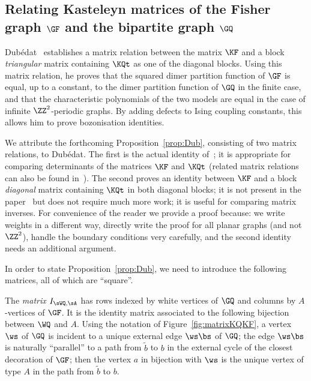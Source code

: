 \documentclass[a4paper,twoside,11pt]{article}
\begin{document}
\subsection{Relating Kasteleyn matrices of the Fisher graph $\GF$ and the bipartite graph $\GQ$}\label{sec:relation_KF_KQ}

Dub\'edat~\cite{Dubedat} establishes a matrix relation between the matrix $\KF$ and a block \emph{triangular}
matrix containing $\KQt$ as one of the diagonal blocks.
Using this matrix relation, he proves that the 
squared dimer partition function of $\GF$ is equal, up to a constant, to the dimer partition function of $\GQ$ in the finite case, and that 
the characteristic polynomials of the two models are equal in the case of infinite $\ZZ^2$-periodic graphs. By adding defects to Ising coupling constants,
this allows him to prove bozonisation identities. 

We attribute the forthcoming Proposition~\ref{prop:Dub}, consisting of two matrix relations, to Dub\'edat. The first is the actual identity of~\cite{Dubedat}; 
it is appropriate for comparing determinants of the matrices $\KF$ and $\KQt$ (related matrix relations can also be found in~\cite{CCK}). 
The second proves an identity between $\KF$ and a 
block \emph{diagonal} matrix containing $\KQt$ in both diagonal blocks; it is not present in the paper~\cite{Dubedat} but does not require much more 
work; it is useful for comparing matrix inverses. For convenience of the reader we provide a proof because: we write weights in a different way,
directly write the proof for all planar graphs (and not $\ZZ^2$), handle the boundary conditions very carefully, and the second identity needs an additional
argument. 

In order to state Proposition~\ref{prop:Dub}, we need to introduce the following matrices, all of which are ``square''. 

The \emph{matrix $I_{\sWQ,\sA}$} has rows indexed by white vertices of $\GQ$ and columns by $A$-vertices of $\GF$. It is the identity matrix 
associated to the following bijection between $\WQ$ and $A$. Using the notation of Figure~\ref{fig:matrixKQKF},
a vertex $\ws$ of $\GQ$ is incident to a unique external edge $\ws\bs$ of $\GQ$; the edge $\ws\bs$
is naturally ``parallel'' to a path from $\tilde{b}$ to $b$ in the external cycle of the closest decoration of $\GF$; then the vertex 
$a$ in bijection with $\ws$ is the unique vertex of type $A$ in the path from $\tilde{b}$ to $b$.
\end{document}
